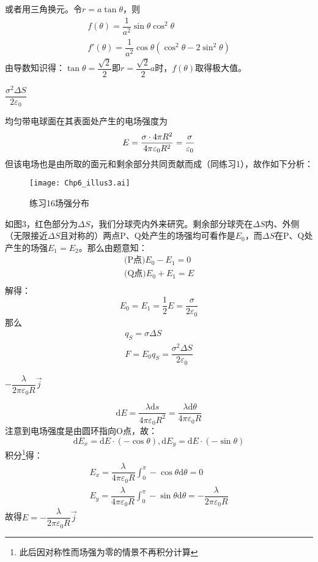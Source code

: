 \documentclass[b5paper,opensource]{./template/qyxf-book}
\newcommand{\di}[1]{\mathrm{d}#1}
\begin{document}
或者用三角换元。令$r=a\tan\theta$，则
\begin{gather*}
	f(\theta)=\dfrac{1}{a^2}\sin\theta\cos^2\theta\\
	f'(\theta)=\dfrac{1}{a^2}\cos\theta(\cos^2\theta-2\sin^2\theta)
\end{gather*}
由导数知识得：$\tan\theta=\dfrac{\sqrt{2}}{2}\text{即}r=\dfrac{\sqrt{2}}{2}a$时，$f(\theta)$取得极大值。

$\dfrac{\sigma^2\Delta S}{2\varepsilon_0}$

\solve
均匀带电球面在其表面处产生的电场强度为
\[
E=\dfrac{\sigma\cdot 4\pi R^2}{4\pi\varepsilon_0R^2}=\dfrac{\sigma}{\varepsilon_0}\\
\]
但该电场也是由所取的面元和剩余部分共同贡献而成（同练习1），故作如下分析：

\begin{figure}[!h]
	\centering
	\texttt{[image: Chp6\_illus3.ai]}
	\caption{练习16\quad 场强分布}
\end{figure}
如图3，红色部分为$\Delta S$，我们分球壳内外来研究。剩余部分球壳在$\Delta S$内、外侧（无限接近$\Delta S$且对称的）两点P、Q处产生的场强均可看作是$E_0$，而$\Delta S$在P、Q处产生的场强$E_1=E_2$。那么由题意知：
\begin{gather*}
	\text{(P点)}E_0-E_1=0\\
	\text{(Q点)}E_0+E_1=E\\
\end{gather*}
解得：
\[
E_0=E_1=\dfrac{1}{2}E=\dfrac{\sigma}{2\varepsilon_0}
\]
那么
\begin{gather*}
	q_S=\sigma\Delta S\\
	F=E_0q_S=\dfrac{\sigma^2\Delta S}{2\varepsilon_0}
\end{gather*}

$-\dfrac{\lambda}{2\pi\varepsilon_0R}\vec{j}$

\solve
\[
\di{E}=\dfrac{\lambda \di{s}}{4\pi \varepsilon_0 R^2}=\dfrac{\lambda \di{\theta}}{4\pi \varepsilon_0 R}
\]
注意到电场强度是由圆环指向O点，故：
\[
\di{E_x}=\di{E}\cdot (-\cos\theta),\di{E_y}=\di{E}\cdot (-\sin\theta)
\]
积分\footnote{此后因对称性而场强为零的情景不再积分计算}得：
\begin{gather*}
	E_x=\dfrac{\lambda}{4\pi \varepsilon_0 R}\int_0^{\pi} -\cos\theta\di{\theta}=0\\
	E_y=\dfrac{\lambda}{4\pi \varepsilon_0 R}\int_0^{\pi} -\sin\theta\di{\theta}=-\dfrac{\lambda}{2\pi\varepsilon_0R}
\end{gather*}
故得$E=-\dfrac{\lambda}{2\pi\varepsilon_0R}\vec{j}$
\end{document}
